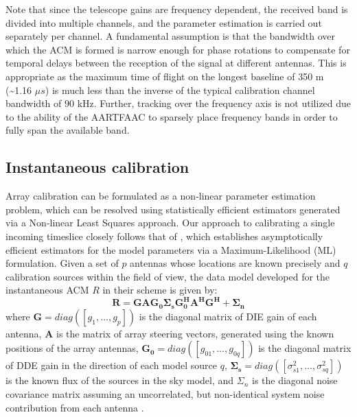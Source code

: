 \documentclass{aa}
\begin{document}
Note that since  the telescope gains are frequency  dependent, the received band
is divided into  multiple channels, and the parameter  estimation is carried out
separately per  channel.  A  fundamental assumption is  that the  bandwidth over
which the ACM  is formed is narrow enough for phase  rotations to compensate for
temporal   delays   between  the   reception   of   the   signal  at   different
antennas\citep{zatman1998narrow}.  This  is appropriate  as the maximum  time of
flight on the longest baseline of  350 m (\textasciitilde{}1.16 $\mu s$) is much
less than the inverse of the  typical calibration channel bandwidth of $90$ kHz.
Further, tracking over the frequency axis  is not utilized due to the ability of
the  AARTFAAC to  sparsely place  frequency  bands in  order to  fully span  the
available band.


\subsection{Instantaneous calibration}

Array  calibration  can  be  formulated  as a  non-linear  parameter  estimation
problem,  which  can  be   resolved  using  statistically  efficient  estimators
generated via a Non-linear Least Squares approach. Our approach to calibrating a
single      incoming      timeslice       closely      follows      that      of
\citep{wijnholds2009multisource},  which  establishes  asymptotically  efficient
estimators   for   the   model   parameters  via   a   Maximum-Likelihood   (ML)
formulation. Given a set of $p$ antennas whose locations are known precisely and
$q$ calibration sources  within the field of view, the  data model developed for
the instantaneous ACM $R$ in their scheme is given by:
\begin{equation}
\mathbf{R=GAG_{0}\Sigma_{s}G_{0}^{H}A^{H}G^{H}+\Sigma_{n}}\label{eq:datamodel}
\end{equation}
where    \textbf{$\mathbf{G=}diag(\left[g_{1},\ldots,g_{p}\right])$    }is   the
diagonal matrix of DIE gain of each antenna, $\mathbf{A}$ is the matrix of array
steering vectors,  generated using  the known positions  of the  array antennas,
$\mathbf{G_{0}=}diag(\left[g_{01},\ldots,g_{0q}\right])$ is  the diagonal matrix
of    DDE   gain    in   the    direction    of   each    model   source    $q$,
$\mathbf{\Sigma_{s}}=diag\left(\left[\sigma_{s1}^{2},\ldots,\sigma_{sq}^{2}\right]\right)$
is the  known flux  of the  sources in the  sky model,  and $\Sigma_{n}$  is the
diagonal  noise covariance  matrix assuming  an uncorrelated,  but non-identical
system noise contribution from each antenna .
\end{document}
